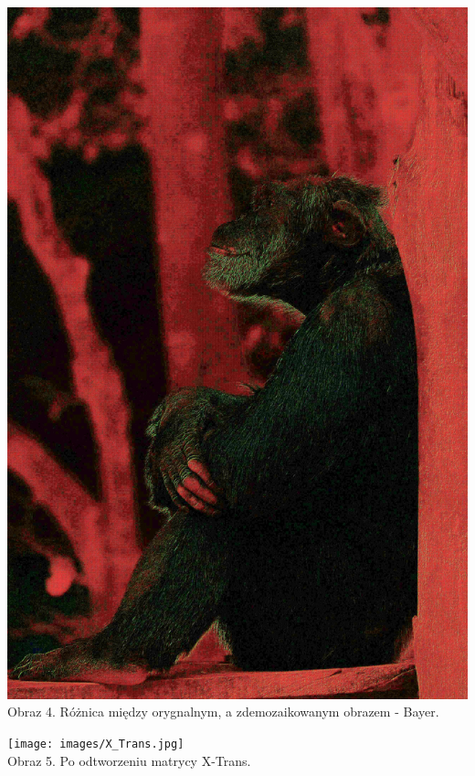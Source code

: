 \documentclass[14pt]{article}
\begin{document}
\begin{center}
    \vspace{0.5cm}
    \includegraphics[scale=0.06]{images/Bayer_DIFF_br.jpg}
    \\ \small Obraz 4. Różnica między orygnalnym, 
    a zdemozaikowanym obrazem - Bayer.

    \vspace{0.5cm}
    \texttt{[image: images/X\_Trans.jpg]}
    \\ \small Obraz 5. Po odtworzeniu matrycy X-Trans.


\end{center}
\end{document}
